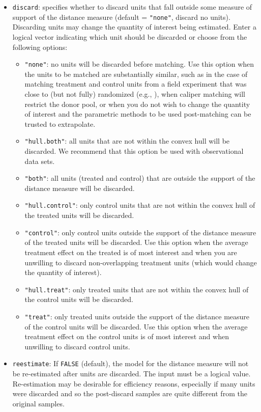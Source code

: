 \begin{itemize}
\item \texttt{discard}: specifies whether to discard units that fall
  outside some measure of support of the distance measure (default =
  \texttt{"none"}, discard no units).  Discarding units may change the
  quantity of interest being estimated. Enter a logical vector
  indicating which unit should be discarded or choose from the
  following options:
  \begin{itemize}
  \item \texttt{"none"}: no units will be discarded before matching.
    Use this option when the units to be matched are substantially
    similar, such as in the case of matching treatment and control
    units from a field experiment that was close to (but not fully)
    randomized (e.g., \citealt{Imai05}), when caliper matching will
    restrict the donor pool, or when you do not wish to change the
    quantity of interest and the parametric methods to be used
    post-matching can be trusted to extrapolate.
  \item \texttt{"hull.both"}: all units that are not within the convex
    hull will be discarded.  We recommend that this option be used
    with observational data sets.
  \item \texttt{"both"}: all units (treated and control) that are
    outside the support of the distance measure will be discarded.
  \item \texttt{"hull.control"}: only control units that are not
    within the convex hull of the treated units will be discarded.  
  \item \texttt{"control"}: only control units outside the support of
    the distance measure of the treated units will be discarded.  Use
    this option when the average treatment effect on the treated is of
    most interest and when you are unwilling to discard
    non-overlapping treatment units (which would change the quantity
    of interest).
  \item \texttt{"hull.treat"}: only treated units that are not within
    the convex hull of the control units will be discarded. 
  \item \texttt{"treat"}: only treated units outside the support of
    the distance measure of the control units will be discarded.  Use
    this option when the average treatment effect on the control units
    is of most interest and when unwilling to discard control units.
  \end{itemize}
  
\item \texttt{reestimate}: If {\tt FALSE} (default), the model for the
  distance measure will not be re-estimated after units are discarded.
  The input must be a logical value.  Re-estimation may be desirable
  for efficiency reasons, especially if many units were discarded and
  so the post-discard samples are quite different from the original
  samples.
  
\end{itemize}

